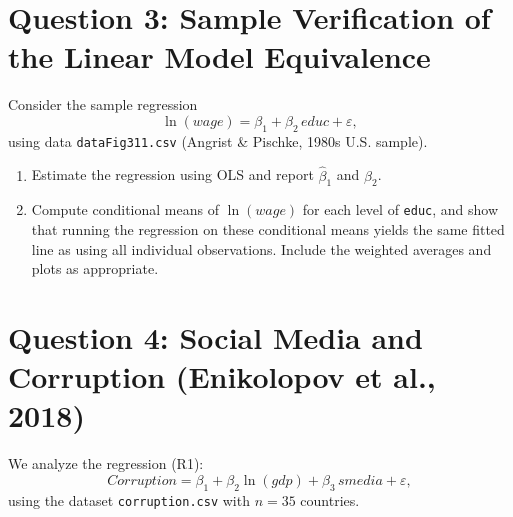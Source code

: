 \documentclass[12pt,a4paper]{article}
\begin{document}
\newpage
\section*{Question 3: Sample Verification of the Linear Model Equivalence}
Consider the sample regression
\[
\ln(wage) = \beta_1 + \beta_2 \, educ + \varepsilon,
\]
using data \texttt{dataFig311.csv} (Angrist \& Pischke, 1980s U.S. sample).

\begin{enumerate}[label=(\alph*)]
  \item Estimate the regression using OLS and report $\hat{\beta}_1$ and $\hat{\beta}_2$.
  \item Compute conditional means of $\ln(wage)$ for each level of \texttt{educ},  
  and show that running the regression on these conditional means yields the same fitted line as using all individual observations.  
  Include the weighted averages and plots as appropriate.
\end{enumerate}

\newpage

\newpage
\section*{Question 4: Social Media and Corruption (Enikolopov et al., 2018)}
We analyze the regression (R1):
\[
Corruption = \beta_1 + \beta_2 \ln(gdp) + \beta_3\, smedia + \varepsilon,
\]
using the dataset \texttt{corruption.csv} with $n=35$ countries.
\end{document}
